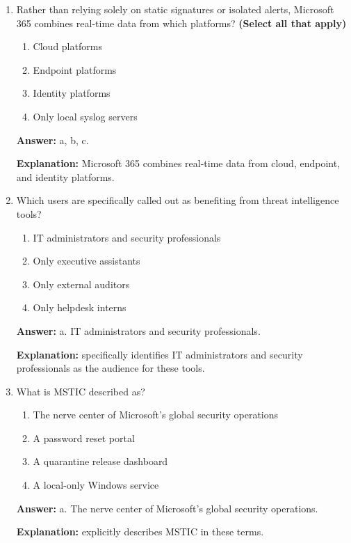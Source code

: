 \documentclass[10pt]{article}
\begin{document}
\begin{enumerate}[leftmargin=*]
\textbf{Explanation:} explicitly frames threat intelligence around understanding attackers, methods, and assets at risk.

\item Rather than relying solely on static signatures or isolated alerts, Microsoft 365 combines real-time data from which platforms? \textbf{(Select all that apply)}
\begin{enumerate}[label=\alph*., leftmargin=1.5em]
\item Cloud platforms
\item Endpoint platforms
\item Identity platforms
\item Only local syslog servers
\end{enumerate}
\textbf{Answer:} a, b, c.

\textbf{Explanation:} Microsoft 365 combines real-time data from cloud, endpoint, and identity platforms.

\item Which users are specifically called out as benefiting from threat intelligence tools?
\begin{enumerate}[label=\alph*., leftmargin=1.5em]
\item IT administrators and security professionals
\item Only executive assistants
\item Only external auditors
\item Only helpdesk interns
\end{enumerate}
\textbf{Answer:} a. IT administrators and security professionals.

\textbf{Explanation:} specifically identifies IT administrators and security professionals as the audience for these tools.

\item What is MSTIC described as?
\begin{enumerate}[label=\alph*., leftmargin=1.5em]
\item The nerve center of Microsoft’s global security operations
\item A password reset portal
\item A quarantine release dashboard
\item A local-only Windows service
\end{enumerate}
\textbf{Answer:} a. The nerve center of Microsoft’s global security operations.

\textbf{Explanation:} explicitly describes MSTIC in these terms.


\end{enumerate}
\end{document}
